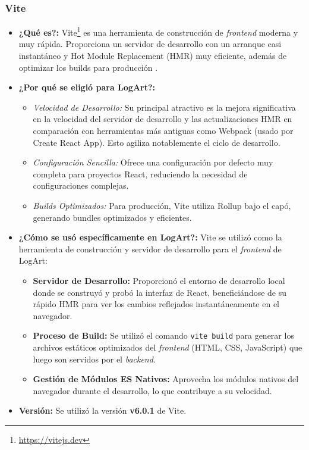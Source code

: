 \subsubsection{Vite}
\label{sec:vite}

    \begin{itemize}
        \item \textbf{¿Qué es?:} Vite\footnote{\url{https://vitejs.dev}} es una herramienta de construcción de \textit{frontend} moderna y muy rápida. Proporciona un servidor de desarrollo con un arranque casi instantáneo y Hot Module Replacement (HMR) muy eficiente, además de optimizar los builds para producción \cite{viteWhy}.
        \item \textbf{¿Por qué se eligió para LogArt?:}
            \begin{itemize}
                \item \textit{Velocidad de Desarrollo:} Su principal atractivo es la mejora significativa en la velocidad del servidor de desarrollo y las actualizaciones HMR en comparación con herramientas más antiguas como Webpack (usado por Create React App). Esto agiliza notablemente el ciclo de desarrollo.
                \item \textit{Configuración Sencilla:} Ofrece una configuración por defecto muy completa para proyectos React, reduciendo la necesidad de configuraciones complejas.
                \item \textit{Builds Optimizados:} Para producción, Vite utiliza Rollup bajo el capó, generando bundles optimizados y eficientes.
            \end{itemize}
        \item \textbf{¿Cómo se usó específicamente en LogArt?:} Vite se utilizó como la herramienta de construcción y servidor de desarrollo para el \textit{frontend} de LogArt:
            \begin{itemize}
                \item \textbf{Servidor de Desarrollo:} Proporcionó el entorno de desarrollo local donde se construyó y probó la interfaz de React, beneficiándose de su rápido HMR para ver los cambios reflejados instantáneamente en el navegador.
                \item \textbf{Proceso de Build:} Se utilizó el comando \texttt{vite build} para generar los archivos estáticos optimizados del \textit{frontend} (HTML, CSS, JavaScript) que luego son servidos por el \textit{backend}.
                \item \textbf{Gestión de Módulos ES Nativos:} Aprovecha los módulos nativos del navegador durante el desarrollo, lo que contribuye a su velocidad.
            \end{itemize}
        \item \textbf{Versión:} Se utilizó la versión \textbf{v6.0.1} de Vite.
    \end{itemize}

